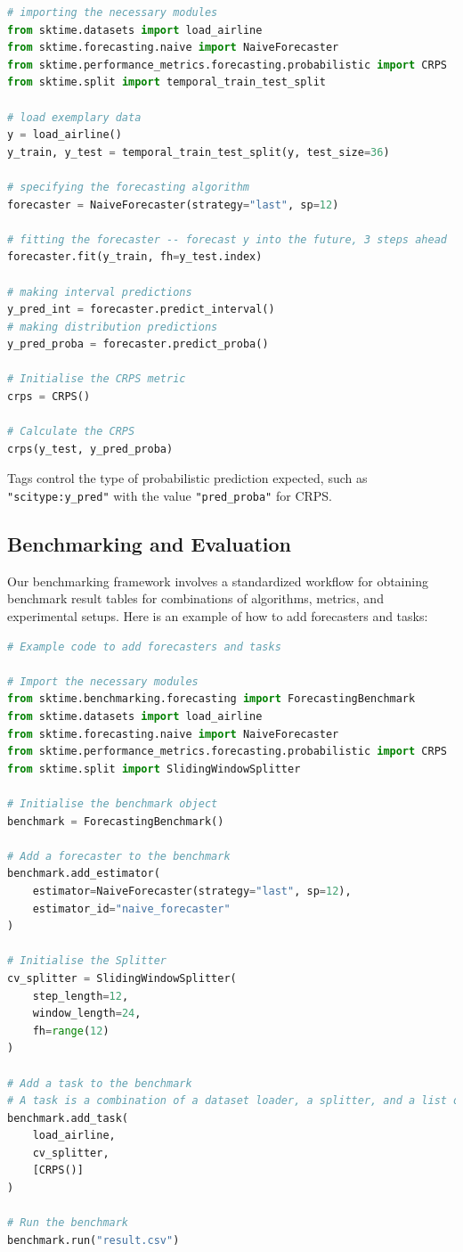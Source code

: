 \begin{lstlisting}[language=Python, caption=Code to make probabilistic forecasts and calculate the CRPS, label=lst:crps]
# importing the necessary modules
from sktime.datasets import load_airline
from sktime.forecasting.naive import NaiveForecaster
from sktime.performance_metrics.forecasting.probabilistic import CRPS
from sktime.split import temporal_train_test_split

# load exemplary data
y = load_airline()
y_train, y_test = temporal_train_test_split(y, test_size=36)

# specifying the forecasting algorithm
forecaster = NaiveForecaster(strategy="last", sp=12)

# fitting the forecaster -- forecast y into the future, 3 steps ahead
forecaster.fit(y_train, fh=y_test.index)

# making interval predictions
y_pred_int = forecaster.predict_interval()
# making distribution predictions
y_pred_proba = forecaster.predict_proba()

# Initialise the CRPS metric
crps = CRPS()

# Calculate the CRPS
crps(y_test, y_pred_proba)
\end{lstlisting}

Tags control the type of probabilistic prediction expected, such as \texttt{"scitype:y\_pred"} with the value \texttt{"pred\_proba"} for CRPS.

\subsection{Benchmarking and Evaluation}
Our benchmarking framework involves a standardized workflow for obtaining benchmark result tables for combinations of algorithms, metrics, and experimental setups. Here is an example of how to add forecasters and tasks:

\begin{lstlisting}[language=Python, caption=Example usage of the ForecastingBenchmark in sktime., label=lst:benchmark]
# Example code to add forecasters and tasks

# Import the necessary modules
from sktime.benchmarking.forecasting import ForecastingBenchmark
from sktime.datasets import load_airline
from sktime.forecasting.naive import NaiveForecaster
from sktime.performance_metrics.forecasting.probabilistic import CRPS
from sktime.split import SlidingWindowSplitter

# Initialise the benchmark object
benchmark = ForecastingBenchmark()

# Add a forecaster to the benchmark
benchmark.add_estimator(
    estimator=NaiveForecaster(strategy="last", sp=12),
    estimator_id="naive_forecaster"
)

# Initialise the Splitter
cv_splitter = SlidingWindowSplitter(
    step_length=12,
    window_length=24,
    fh=range(12)
)

# Add a task to the benchmark
# A task is a combination of a dataset loader, a splitter, and a list of metrics
benchmark.add_task(
    load_airline,
    cv_splitter,
    [CRPS()]
)

# Run the benchmark
benchmark.run("result.csv")
\end{lstlisting}

